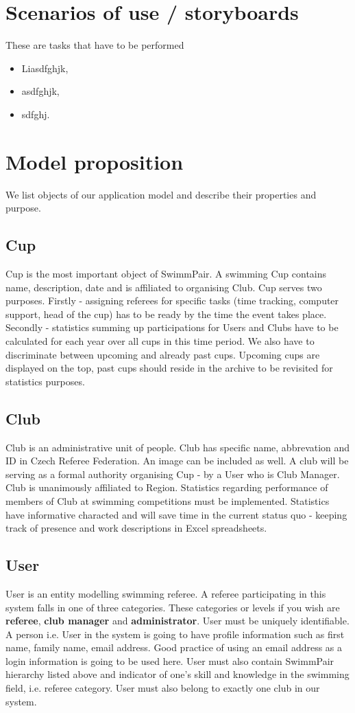 \section{Scenarios of use / storyboards}
These are tasks that have to be performed
\begin{itemize}
    \item Liasdfghjk,
    \item asdfghjk,
    \item sdfghj.
  \end{itemize}
\section{Model proposition}
We list objects of our application model and describe their properties and purpose.
\subsection*{Cup}
Cup is the most important object of SwimmPair. A swimming Cup contains name, description, date and is affiliated to organising Club. Cup serves two purposes. Firstly - assigning referees for specific tasks (time tracking, computer support, head of the cup) has to be ready by the time the event takes place. Secondly - statistics summing up participations for Users and Clubs have to be calculated for each year over all cups in this time period. We also have to discriminate between upcoming and already past cups. Upcoming cups are displayed on the top, past cups should reside in the archive to be revisited for statistics purposes.
\subsection*{Club}
\par
Club is an administrative unit of people. Club has specific name, abbrevation and ID in Czech Referee Federation. An image can be included as well. A club will be serving as a formal authority organising Cup - by a User who is Club Manager. Club is unanimously affiliated to Region. Statistics regarding performance of members of Club at swimming competitions must be implemented. Statistics have informative characted and will save time in the current status quo - keeping track of presence and work descriptions in Excel spreadsheets. 
\subsection*{User}
\par
User is an entity modelling swimming referee. A referee participating in this system falls in one of three categories. These categories or levels if you wish are \textbf{referee}, \textbf{club manager} and \textbf{administrator}. User must be uniquely identifiable. A person i.e. User in the system is going to have profile information such as first name, family name, email address. Good practice of using an email address as a login information is going to be used here. User must also contain SwimmPair hierarchy listed above and indicator of one's skill and knowledge in the swimming field, i.e. referee category. User must also belong to exactly one club in our system.
